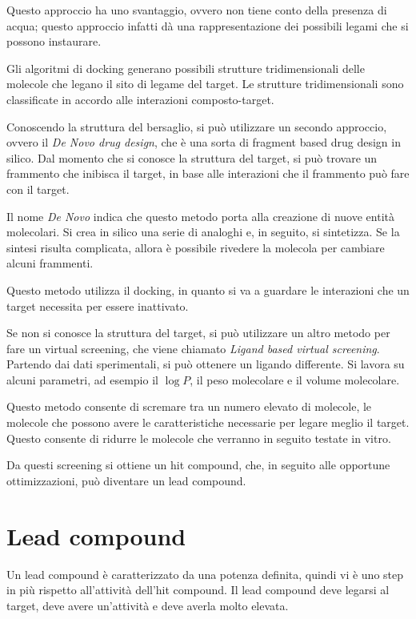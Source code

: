 Questo approccio ha uno svantaggio, ovvero non tiene conto della
presenza di acqua; questo approccio infatti dà una rappresentazione dei
possibili legami che si possono instaurare.

Gli algoritmi di docking generano possibili strutture tridimensionali
delle molecole che legano il sito di legame del target. Le strutture
tridimensionali sono classificate in accordo alle interazioni
composto-target.

Conoscendo la struttura del bersaglio, si può utilizzare un secondo
approccio, ovvero il \emph{De Novo drug design}, che è una sorta di
fragment based drug design in silico. Dal momento che si conosce la
struttura del target, si può trovare un frammento che inibisca il
target, in base alle interazioni che il frammento può fare con il
target.

Il nome \emph{De Novo} indica che questo metodo porta alla creazione di
nuove entità molecolari. Si crea in silico una serie di analoghi e, in
seguito, si sintetizza. Se la sintesi risulta complicata, allora è
possibile rivedere la molecola per cambiare alcuni frammenti.

Questo metodo utilizza il docking, in quanto si va a guardare le
interazioni che un target necessita per essere inattivato.

Se non si conosce la struttura del target, si può utilizzare un altro
metodo per fare un virtual screening, che viene chiamato \emph{Ligand
based virtual screening}. Partendo dai dati sperimentali, si può
ottenere un ligando differente. Si lavora su alcuni parametri, ad
esempio il \(\log{} P\), il peso molecolare e il volume molecolare.

Questo metodo consente di scremare tra un numero elevato di molecole, le
molecole che possono avere le caratteristiche necessarie per legare
meglio il target. Questo consente di ridurre le molecole che verranno in
seguito testate in vitro.

Da questi screening si ottiene un hit compound, che, in seguito alle
opportune ottimizzazioni, può diventare un lead compound.

\section{Lead compound}

Un lead compound è caratterizzato da una potenza definita, quindi vi è
uno step in più rispetto all'attività dell'hit compound. Il lead
compound deve legarsi al target, deve avere un'attività e deve averla
molto elevata.

